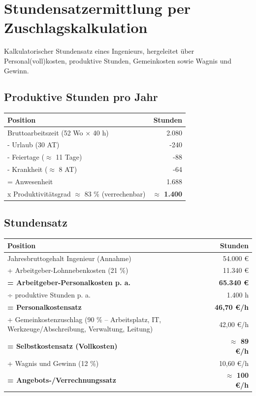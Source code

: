\documentclass[
  a4paper,
  12pt,
  DIV=12,        %
  parskip=half,  %
  headings=small %
]{scrartcl}
\theoremstyle{definition}
\theoremstyle{definition}
\begin{document}
\section{Stundensatzermittlung per Zuschlagskalkulation}



Kalkulatorischer Stundensatz eines Ingenieurs, hergeleitet über Personal(voll)kosten, produktive Stunden, Gemeinkosten sowie Wagnis und Gewinn.



\subsection{Produktive Stunden pro Jahr}


\begin{tabularx}{\textwidth}{X@{}r}
\toprule
\textbf{Position} & \textbf{Stunden} \\
\midrule
Bruttoarbeitszeit (52 Wo × 40 h) & 2.080 \\
- Urlaub (30 AT) & -240 \\
- Feiertage ($\approx$ 11 Tage) & -88 \\
 - Krankheit ($\approx$ 8 AT) & -64 \\
 = Anwesenheit & 1.688  \\
 x Produktivitätsgrad $\approx$ 83 \% (verrechenbar) & \textbf{$\approx$ 1.400} \\
\bottomrule
\end{tabularx}


\subsection{Stundensatz}


\begin{tabularx}{\textwidth}{X@{}r}
\toprule
\textbf{Position} & \textbf{Stunden} \\
\midrule
Jahresbruttogehalt Ingenieur (Annahme) & 54.000 \euro \\
+ Arbeitgeber-Lohnnebenkosten (21 \%) & 11.340 € \\
\textbf{= Arbeitgeber-Personalkosten p. a.} & \textbf{65.340 \euro} \\
÷ produktive Stunden p. a. & 1.400 h \\
\textbf{= Personalkostensatz}  & \textbf{46,70 \euro /h} \\
+ Gemeinkostenzuschlag (90 \% – Arbeitsplatz, IT, Werkzeuge/Abschreibung, Verwaltung, Leitung) & 42,00 \euro /h \\
\textbf{= Selbstkostensatz (Vollkosten)} & \textbf{$\approx$ 89 \euro /h} \\
+ Wagnis und Gewinn (12 \%) & 10,60 €/h \\
\textbf{= Angebots-/Verrechnungssatz}  & \textbf{$\approx$ 100 \euro /h} \\
\bottomrule
\end{tabularx}
\end{document}
